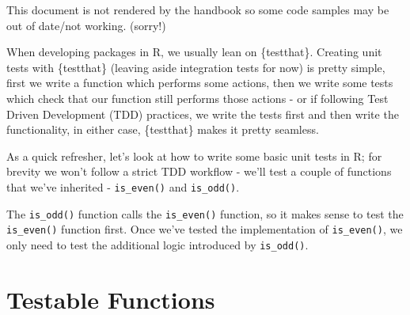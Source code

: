\documentclass[
  letterpaper,
  DIV=11,
  numbers=noendperiod]{scrreprt}
\begin{document}
\begin{tcolorbox}[enhanced jigsaw, opacitybacktitle=0.6, breakable, title=\textcolor{quarto-callout-warning-color}{\faExclamationTriangle}\hspace{0.5em}{Warning}, arc=.35mm, colframe=quarto-callout-warning-color-frame, colbacktitle=quarto-callout-warning-color!10!white, left=2mm, bottomrule=.15mm, opacityback=0, toprule=.15mm, bottomtitle=1mm, toptitle=1mm, titlerule=0mm, leftrule=.75mm, colback=white, rightrule=.15mm, coltitle=black]

This document is not rendered by the handbook so some code samples may
be out of date/not working. (sorry!)

\end{tcolorbox}

When developing packages in R, we usually lean on \{testthat\}. Creating
unit tests with \{testthat\} (leaving aside integration tests for now)
is pretty simple, first we write a function which performs some actions,
then we write some tests which check that our function still performs
those actions - or if following Test Driven Development (TDD) practices,
we write the tests first and then write the functionality, in either
case, \{testthat\} makes it pretty seamless.

As a quick refresher, let's look at how to write some basic unit tests
in R; for brevity we won't follow a strict TDD workflow - we'll test a
couple of functions that we've inherited - \texttt{is\_even()} and
\texttt{is\_odd()}.

\begin{tcolorbox}[enhanced jigsaw, opacitybacktitle=0.6, breakable, title=\textcolor{quarto-callout-tip-color}{\faLightbulb}\hspace{0.5em}{Tip}, arc=.35mm, colframe=quarto-callout-tip-color-frame, colbacktitle=quarto-callout-tip-color!10!white, left=2mm, bottomrule=.15mm, opacityback=0, toprule=.15mm, bottomtitle=1mm, toptitle=1mm, titlerule=0mm, leftrule=.75mm, colback=white, rightrule=.15mm, coltitle=black]

The \texttt{is\_odd()} function calls the \texttt{is\_even()} function,
so it makes sense to test the \texttt{is\_even()} function first. Once
we've tested the implementation of \texttt{is\_even()}, we only need to
test the additional logic introduced by \texttt{is\_odd()}.

\end{tcolorbox}

\section{Testable Functions}\label{testable-functions}
\end{document}
